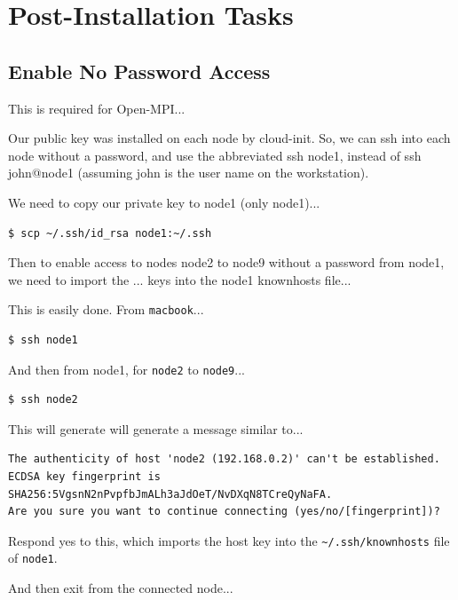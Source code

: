 \documentclass{report}
\begin{document}
%
%
\clearpage\section{Post-Installation Tasks}

\subsection{Enable No Password Access}

This is required for Open-MPI...

Our public key was installed on each node by cloud-init. So, we can ssh into each node without a password, and use the abbreviated ssh node1, instead of ssh john@node1 (assuming john is the user name on the workstation).

We need to copy our private key to node1 (only node1)...

\lstset{style=type}
\begin{lstlisting}
$ scp ~/.ssh/id_rsa node1:~/.ssh
\end{lstlisting}

Then to enable access to nodes node2 to node9 without a password from node1, we need to import the ... keys into the node1 knownhosts file...

This is easily done. From \verb|macbook|...

\lstset{style=type}
\begin{lstlisting}[]
$ ssh node1
\end{lstlisting}

And then from node1, for \verb|node2| to \verb|node9|...

\lstset{style=type}
\begin{lstlisting}[]
$ ssh node2
\end{lstlisting}

This will generate will generate a message similar to...

\lstset{style=type}
\begin{lstlisting}[]
The authenticity of host 'node2 (192.168.0.2)' can't be established.
ECDSA key fingerprint is SHA256:5VgsnN2nPvpfbJmALh3aJdOeT/NvDXqN8TCreQyNaFA.
Are you sure you want to continue connecting (yes/no/[fingerprint])?
\end{lstlisting}

Respond yes to this, which imports the host key into the \verb|~/.ssh/knownhosts| file of \verb|node1|.

And then exit from the connected node...
\end{document}
